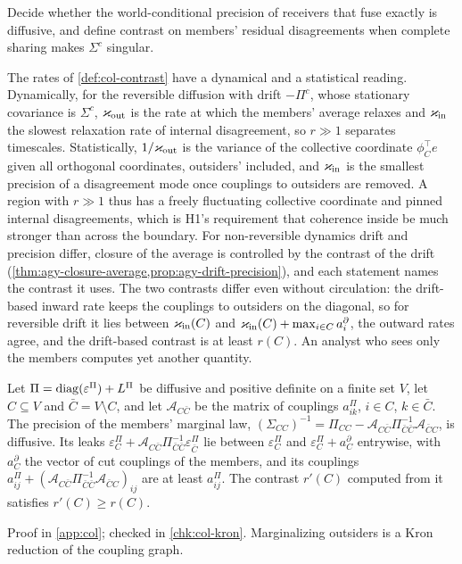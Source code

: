 \begin{openproblem}\label{open:col-exact-fusion}
Decide whether the world-conditional precision of receivers that fuse exactly is diffusive, and define contrast on members' residual disagreements when complete sharing makes $\Sigma^c$ singular.
\end{openproblem}

The rates of \cref{def:col-contrast} have a dynamical and a statistical reading. Dynamically, for the reversible diffusion with drift $-\Pi^c$, whose stationary covariance is $\Sigma^c$, $\varkappa_{\mathrm{out}}$ is the rate at which the members' average relaxes and $\varkappa_{\mathrm{in}}$ the slowest relaxation rate of internal disagreement, so $r\gg1$ separates timescales. Statistically, $1/\varkappa_{\mathrm{out}}$ is the variance of the collective coordinate $\phi_C^\top e$ given all orthogonal coordinates, outsiders' included, and $\varkappa_{\mathrm{in}}$ is the smallest precision of a disagreement mode once couplings to outsiders are removed. A region with $r\gg1$ thus has a freely fluctuating collective coordinate and pinned internal disagreements, which is H1's requirement that coherence inside be much stronger than across the boundary. For non-reversible dynamics drift and precision differ, closure of the average is controlled by the contrast of the drift (\cref{thm:agy-closure-average,prop:agy-drift-precision}), and each statement names the contrast it uses. The two contrasts differ even without circulation: the drift-based inward rate keeps the couplings to outsiders on the diagonal, so for reversible drift it lies between $\varkappa_{\mathrm{in}}(C)$ and $\varkappa_{\mathrm{in}}(C)+\max_{i\in C}a^\partial_i$, the outward rates agree, and the drift-based contrast is at least $r(C)$. An analyst who sees only the members computes yet another quantity.

\begin{lemma}\label{lem:col-kron}
Let $\Pi=\operatorname{diag}(\varepsilon^\Pi)+L^\Pi$ be diffusive and positive definite on a finite set $V$, let $C\subseteq V$ and $\bar C=V\setminus C$, and let $\mathcal A_{C\bar C}$ be the matrix of couplings $a^\Pi_{ik}$, $i\in C$, $k\in\bar C$. The precision of the members' marginal law, $(\Sigma_{CC})^{-1}=\Pi_{CC}-\mathcal A_{C\bar C}\Pi_{\bar C\bar C}^{-1}\mathcal A_{\bar CC}$, is diffusive. Its leaks $\varepsilon^\Pi_C+\mathcal A_{C\bar C}\Pi_{\bar C\bar C}^{-1}\varepsilon^\Pi_{\bar C}$ lie between $\varepsilon^\Pi_C$ and $\varepsilon^\Pi_C+a^\partial_C$ entrywise, with $a^\partial_C$ the vector of cut couplings of the members, and its couplings $a^\Pi_{ij}+(\mathcal A_{C\bar C}\Pi_{\bar C\bar C}^{-1}\mathcal A_{\bar CC})_{ij}$ are at least $a^\Pi_{ij}$. The contrast $r'(C)$ computed from it satisfies $r'(C)\ge r(C)$.
\end{lemma}
Proof in \cref{app:col}; checked in \cref{chk:col-kron}. Marginalizing outsiders is a Kron reduction of the coupling graph.

